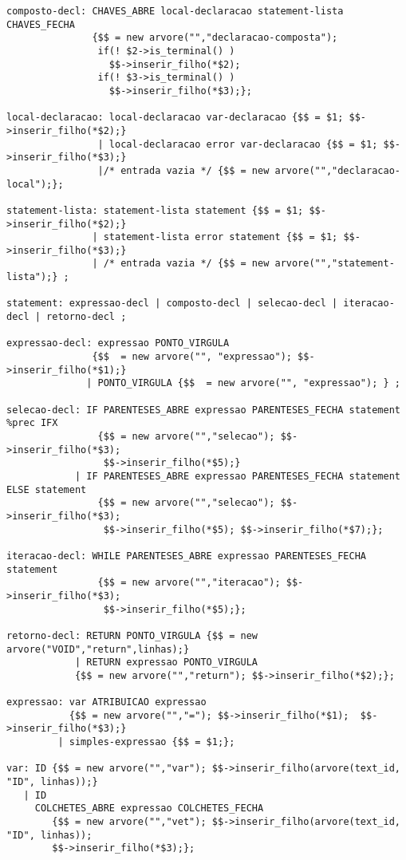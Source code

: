 \begin{lstlisting}
composto-decl: CHAVES_ABRE local-declaracao statement-lista CHAVES_FECHA
               {$$ = new arvore("","declaracao-composta");
                if(! $2->is_terminal() )
                  $$->inserir_filho(*$2);
                if(! $3->is_terminal() )
                  $$->inserir_filho(*$3);};

local-declaracao: local-declaracao var-declaracao {$$ = $1; $$->inserir_filho(*$2);}
                | local-declaracao error var-declaracao {$$ = $1; $$->inserir_filho(*$3);}
                |/* entrada vazia */ {$$ = new arvore("","declaracao-local");};

statement-lista: statement-lista statement {$$ = $1; $$->inserir_filho(*$2);}
               | statement-lista error statement {$$ = $1; $$->inserir_filho(*$3);}
               | /* entrada vazia */ {$$ = new arvore("","statement-lista");} ;

statement: expressao-decl | composto-decl | selecao-decl | iteracao-decl | retorno-decl ;

expressao-decl: expressao PONTO_VIRGULA 
               {$$  = new arvore("", "expressao"); $$->inserir_filho(*$1);}
              | PONTO_VIRGULA {$$  = new arvore("", "expressao"); } ;

selecao-decl: IF PARENTESES_ABRE expressao PARENTESES_FECHA statement %prec IFX
                {$$ = new arvore("","selecao"); $$->inserir_filho(*$3);
                 $$->inserir_filho(*$5);}
            | IF PARENTESES_ABRE expressao PARENTESES_FECHA statement ELSE statement
                {$$ = new arvore("","selecao"); $$->inserir_filho(*$3); 
                 $$->inserir_filho(*$5); $$->inserir_filho(*$7);};

iteracao-decl: WHILE PARENTESES_ABRE expressao PARENTESES_FECHA statement
                {$$ = new arvore("","iteracao"); $$->inserir_filho(*$3); 
                 $$->inserir_filho(*$5);};

retorno-decl: RETURN PONTO_VIRGULA {$$ = new arvore("VOID","return",linhas);}
            | RETURN expressao PONTO_VIRGULA
            {$$ = new arvore("","return"); $$->inserir_filho(*$2);};

expressao: var ATRIBUICAO expressao
           {$$ = new arvore("","="); $$->inserir_filho(*$1);  $$->inserir_filho(*$3);}
         | simples-expressao {$$ = $1;};

var: ID {$$ = new arvore("","var"); $$->inserir_filho(arvore(text_id, "ID", linhas));}
   | ID
     COLCHETES_ABRE expressao COLCHETES_FECHA
        {$$ = new arvore("","vet"); $$->inserir_filho(arvore(text_id, "ID", linhas));
        $$->inserir_filho(*$3);};


\end{lstlisting}
